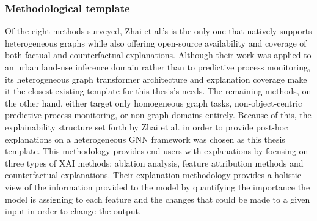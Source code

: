         \subsubsection{Methodological template}
        Of the eight methods surveyed, Zhai et al.'s \cite{zhai2025} is the only one that natively supports heterogeneous graphs while also offering open-source availability and coverage of both factual and counterfactual explanations. Although their work was applied to an urban land-use inference domain rather than to predictive process monitoring, its heterogeneous graph transformer architecture and explanation coverage make it the closest existing template for this thesis's needs. The remaining methods, on the other hand, either target only homogeneous graph tasks, non-object-centric predictive process monitoring, or non-graph domains entirely. Because of this, the explainability structure set forth by Zhai et al. \cite{zhai2025} in order to provide post-hoc explanations on a heterogeneous GNN framework was chosen as this thesis template. This methodology provides end users with explanations by focusing on three types of XAI methods: ablation analysis, feature attribution methods and counterfactual explanations. Their explanation methodology provides a holistic view of the information provided to the model by quantifying the importance the model is assigning to each feature and the changes that could be made to a given input in order to change the output. 


